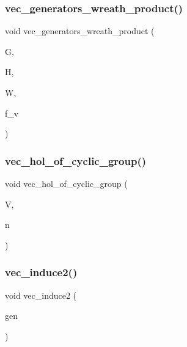 \subsubsection{\texorpdfstring{vec\+\_\+generators\+\_\+wreath\+\_\+product()}{vec\_generators\_wreath\_product()}}
{\footnotesize\ttfamily void vec\+\_\+generators\+\_\+wreath\+\_\+product (\begin{DoxyParamCaption}\item[{\mbox{\hyperlink{class_vector}{Vector}} \&}]{G,  }\item[{\mbox{\hyperlink{class_vector}{Vector}} \&}]{H,  }\item[{\mbox{\hyperlink{class_vector}{Vector}} \&}]{W,  }\item[{\mbox{\hyperlink{galois_8h_a09fddde158a3a20bd2dcadb609de11dc}{I\+NT}}}]{f\+\_\+v }\end{DoxyParamCaption})}

\mbox{\label{perm__group__gens_8_c_a9d07604f4a1c321585752cabfc94955b}} 
\subsubsection{\texorpdfstring{vec\+\_\+hol\+\_\+of\+\_\+cyclic\+\_\+group()}{vec\_hol\_of\_cyclic\_group()}}
{\footnotesize\ttfamily void vec\+\_\+hol\+\_\+of\+\_\+cyclic\+\_\+group (\begin{DoxyParamCaption}\item[{\mbox{\hyperlink{class_vector}{Vector}} \&}]{V,  }\item[{\mbox{\hyperlink{galois_8h_a09fddde158a3a20bd2dcadb609de11dc}{I\+NT}}}]{n }\end{DoxyParamCaption})}

\mbox{\label{perm__group__gens_8_c_ac60864f2b7c636649eca13b67280fbe1}} 
\subsubsection{\texorpdfstring{vec\+\_\+induce2()}{vec\_induce2()}}
{\footnotesize\ttfamily void vec\+\_\+induce2 (\begin{DoxyParamCaption}\item[{\mbox{\hyperlink{class_vector}{Vector}} \&}]{gen }\end{DoxyParamCaption})}

